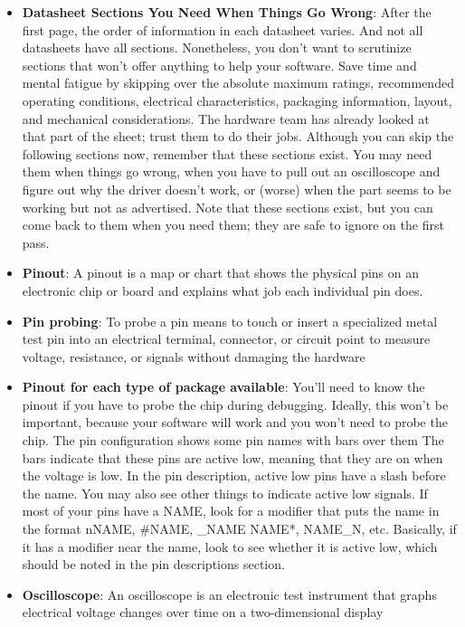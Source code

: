 \documentclass{report}
\begin{document}
\begin{itemize}
        \item \textbf{Datasheet Sections You Need When Things Go Wrong}: After the first page, the order of information in each datasheet varies. And not all datasheets have all sections. Nonetheless, you don’t want to scrutinize sections that won’t offer anything to help your software. Save time and mental fatigue by skipping over the absolute maximum ratings, recommended operating conditions, electrical characteristics, packaging information, layout, and mechanical considerations. The hardware team has already looked at that part of the sheet; trust them to do their jobs.
            \bigbreak \noindent 
            Although you can skip the following sections now, remember that these sections exist. You may need them when things go wrong, when you have to pull out an oscilloscope and figure out why the driver doesn’t work, or (worse) when the part seems to be working but not as advertised. Note that these sections exist, but you can come back to them when you need them; they are safe to ignore on the first pass.
        \item \textbf{Pinout}: A pinout is a map or chart that shows the physical pins on an electronic chip or board and explains what job each individual pin does.
        \item \textbf{Pin probing}: To probe a pin means to touch or insert a specialized metal test pin into an electrical terminal, connector, or circuit point to measure voltage, resistance, or signals without damaging the hardware
        \item \textbf{Pinout for each type of package available}: You’ll need to know the pinout if you have to probe the chip during debugging. Ideally, this won’t be important, because your software will work and you won’t need to probe the chip.
            \bigbreak \noindent 
            The pin configuration shows some pin names with bars over them
            \bigbreak \noindent 
            \bigbreak \noindent 
            The bars indicate that these pins are active low, meaning that they are on when the voltage is low. In the pin description, active low pins have a slash before the name. You may also see other things to indicate active low signals. If most of your pins have a NAME, look for a modifier that puts the name in the format nNAME, \#NAME, \_NAME NAME*, NAME\_N, etc. Basically, if it has a modifier near the name, look to see whether it is active low, which should be noted in the pin descriptions section.
        \item \textbf{Oscilloscope}: An oscilloscope is an electronic test instrument that graphs electrical voltage changes over time on a two-dimensional display

\end{itemize}
\end{document}

